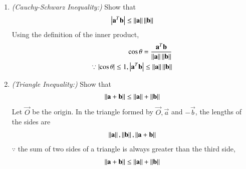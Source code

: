 \renewcommand{\theequation}{\theenumi}
\begin{enumerate}[label=\thesubsection.\arabic*.,ref=\thesubsection.\theenumi]
\item {\em  (Cauchy-Schwarz Inequality:)} Show that 
%
\begin{align}
\left\vert\mathbf{a}^T\mathbf{b}\right\vert \le \left\lVert\mathbf{a}\right\rVert\left\lVert\mathbf{b}\right\rVert
\end{align}
\proof  Using the definition of the inner product,
\begin{align}
\cos \theta = \frac{\mathbf{a}^T\mathbf{b}} {\left\lVert\mathbf{a}\right\rVert\left\lVert\mathbf{b}\right\rVert} 
\\
\because \left\vert\cos \theta\right\vert \le 1, 
\left\vert\mathbf{a}^T\mathbf{b}\right\vert \le \left\lVert\mathbf{a}\right\rVert\left\lVert\mathbf{b}\right\rVert
\end{align}
\item {\em (Triangle Inequality:)} Show that 
%
\begin{align}
\left\lVert\mathbf{a}+\mathbf{b}\right\rVert \le \left\lVert\mathbf{a}\right\rVert+\left\lVert\mathbf{b}\right\rVert
\end{align}
\proof Let $\vec{O}$ be the origin.  In the triangle formed by $\vec{O}, \vec{a}$ and $-\vec{b}$, the lengths of the sides are
%
\begin{align}
\left\lVert\mathbf{a}\right\rVert, 
\left\lVert\mathbf{b}\right\rVert, 
\left\lVert\mathbf{a}+\mathbf{b}\right\rVert 
\end{align}
%
$\because $ the sum of two sides of a triangle is always greater than the third side, 
\begin{align}
\left\lVert\mathbf{a}+\mathbf{b}\right\rVert \le \left\lVert\mathbf{a}\right\rVert + \left\lVert\mathbf{b}\right\rVert
\end{align}

\end{enumerate}
